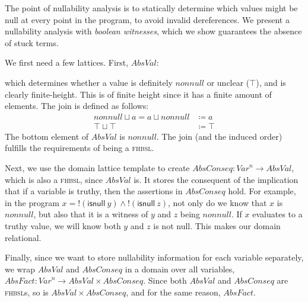 \documentclass[runningheads]{llncs}
\newcommand{\lub}{\sqcup}
\newcommand{\fhbsl}{\textsc{fhbsl}}
\newcommand{\Var}{\mathit{Var}}
\newcommand{\AbsVal}{\mathit{AbsVal}}
\newcommand{\AbsConseq}{\mathit{AbsConseq}}
\newcommand{\AbsFact}{\mathit{AbsFact}}
\newcommand{\nonnull}{\mathit{nonnull}}
\newcommand{\kisnull}{\mathsf{isnull}}
\begin{document}
The point of nullability analysis is to statically determine which values might be null at every point in the program, to avoid invalid dereferences. We present a nullability analysis with \textit{boolean witnesses}, which we show guarantees the absence of stuck terms.

We first need a few lattices. First, $\AbsVal$:
\begin{center}
\end{center}
which determines whether a value is definitely $\nonnull$ or unclear ($\top$), and is clearly finite-height. This is of finite height since it has a finite amount of elements. The join is defined as follows:
\begin{align*}
  \nonnull \lub a = a \lub \nonnull & \coloneqq a \\
  \top \lub \top & \coloneqq \top
\end{align*}
The bottom element of $\AbsVal$ is $\nonnull$. The join (and the induced order) fulfills the requirements of being a \fhbsl.

Next, we use the domain lattice template to create $\AbsConseq : \Var^n \to \AbsVal$, which is also a \fhbsl,   since $\AbsVal$ is. It stores the consequent of the implication that if a variable is truthy, then the assertions in $\AbsConseq$ hold. For example, in the program $x = {!}(\kisnull\ y) \wedge {!}(\kisnull\ z)$, not only do we know that $x$ is $\nonnull$, but also that it is a witness of $y$ and $z$ being $\nonnull$. If $x$ evaluates to a truthy value, we will know both $y$ and $z$ is not null. This makes our domain relational.

Finally, since we want to store nullability information for each variable separately, we wrap $\AbsVal$ and $\AbsConseq$ in a domain over all variables, $\AbsFact : \Var^n \to \AbsVal \times \AbsConseq$. Since both $\AbsVal$ and $\AbsConseq$ are \fhbsl{}s, so is $\AbsVal \times \AbsConseq$, and for the same reason, $\AbsFact$.
\end{document}
